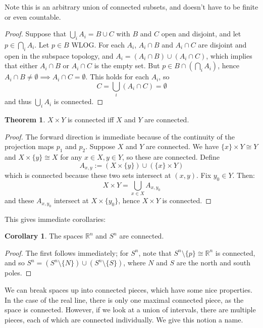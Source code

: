 \documentclass[11pt, oneside]{amsart}   	%
\theoremstyle{definition}
\newtheorem{theorem}{Theorem}[section]
\newtheorem{corollary}{Corollary}[theorem]
\begin{document}
	Note this is an arbitrary union of connected subsets, and doesn't have to be finite or even countable. 
	
	\begin{proof}
		Suppose that $\bigcup_i A_i = B\cup C$ with $B$ and $C$ open and disjoint, and let $p\in\bigcap_i A_i$. Let $p\in B$ WLOG. For each $A_i$, 
		$A_i\cap B$ and $A_i\cap C$ are disjoint and open in the subspace topology, and $A_i = (A_i\cap B)\cup (A_i\cap C)$, which implies that either 
		$A_i\cap B$ or $A_i\cap C$ is the empty set. But $p\in B\cap(\bigcap_i A_i)$, hence $A_i\cap B\neq\emptyset\implies A_i\cap C = \emptyset$. 
		This holds for each $A_i$, so
		$$
			C = \bigcup_i (A_i\cap C) = \emptyset
		$$
		and thus $\bigcup_i A_i$ is connected.
	\end{proof}
	
	\begin{theorem}
		$X\times Y$ is connected iff $X$ and $Y$ are connected.
	\end{theorem}
	
	\begin{proof}
		The forward direction is immediate because of the continuity of the projection maps $p_1$ and $p_2$. Suppose $X$ and $Y$ are connected. We 
		have $\{x\}\times Y\cong Y$ and $X\times\{y\}\cong X$ for any $x\in X, y\in Y$, so these are connected. Define 
		$$
			A_{x, y} := (X\times \{y\})\cup (\{x\}\times Y)
		$$
		which is connected because these two sets intersect at $(x, y)$. Fix $y_0\in Y$. Then:
		$$
			X\times Y = \bigcup_{x\in X} A_{x, y_0}
		$$
		and these $A_{x, y_0}$ intersect at $X\times \{y_0\}$, hence $X\times Y$ is connected.
	\end{proof}
	
	This gives immediate corollaries:
	\begin{corollary}
		The spaces $\mathbb R^n$ and $S^n$ are connected.
	\end{corollary}
	
	\begin{proof}
		The first follows immediately; for $S^n$, note that $S^n\setminus\{p\}\cong\mathbb R^n$ is connected, and so $S^n = (S^n\setminus\{N\})\cup(S^n
		\setminus\{S\})$, where $N$ and $S$ are the north and south poles.
	\end{proof}
	
	We can break spaces up into connected pieces, which have some nice properties. In the case of the real line, there is only one maximal connected piece, 
	as the space is connected. However, if we look at a union of intervals, there are multiple pieces, each of which are connected individually. We give this 
	notion a name.
	
\end{document}

